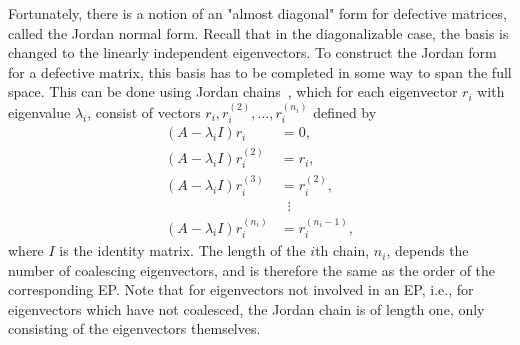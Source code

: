\documentclass[../main.tex]{subfiles}
\begin{document}
Fortunately, there is a notion of an "almost diagonal" form for defective matrices, called the Jordan normal form. Recall that in the diagonalizable case, the basis is changed to the linearly independent eigenvectors. To construct the Jordan form for a defective matrix, this basis has to be completed in some way to span the full space. This can be done using Jordan chains~\cite{uffe}, which for each eigenvector $r_i$ with eigenvalue $\lambda_i$, consist of vectors $r_i, r_i^{(2)}, \dots,   r_i^{(n_i)}$ defined by
\begin{equation}\label{jordanchain}
\begin{aligned}
    (A-\lambda_iI)r_i &= 0, \\
    (A-\lambda_iI)r_i^{(2)} &= r_i, \\
    (A-\lambda_iI)r_i^{(3)} &= r_i^{(2)}, \\
    &\;\;\vdots \\
    (A-\lambda_iI)r_i^{(n_i)} &= r_i^{(n_i-1)},
\end{aligned}
\end{equation}
where $I$ is the identity matrix. The length of the $i$th chain, $n_i$, depends the number of coalescing eigenvectors, and is therefore the same as the order of the corresponding EP. Note that for eigenvectors not involved in an EP, i.e., for eigenvectors which have not coalesced, the Jordan chain is of length one, only consisting of the eigenvectors themselves.
\end{document}
